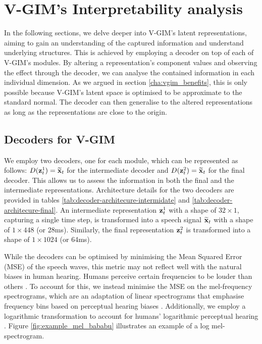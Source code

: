 \section{V-GIM's Interpretability analysis} 
	In the following sections, we delve deeper into V-GIM's latent representations, aiming to gain an understanding of the captured information and understand underlying structures. This is achieved by employing a decoder on top of each of V-GIM's modules. By altering a representation's component values and observing the effect through the decoder, we can analyse the contained information in each individual dimension. As we argued in section \ref{cha:vgim_benefits}, this is only possible because V-GIM's latent space is optimised to be approximate to the standard normal. The decoder can then generalise to the altered representations as long as the representations are close to the origin.
	
	\subsection{Decoders for V-GIM} \label{cha:experiments_interp_analy_decoder}
		We employ two decoders, one for each module, which can be represented as follows: $D(\mathbf{z}_t^1) = \widetilde{\mathbf{x}}_t$ for the intermediate decoder and $D(\mathbf{z}_t^2) = \widetilde{\mathbf{x}}_t$ for the final decoder. This allows us to assess the information in both the final and the intermediate representations. Architecture details for the two decoders are provided in tables \ref{tab:decoder-architecure-intermidate} and \ref{tab:decoder-architecure-final}. 
		An intermediate representation $\mathbf{z}_t^1$ with a shape of $32 \times 1$, capturing a single time step, is transformed into a speech signal $\widetilde{\mathbf{x}}_t$ with a shape of $1 \times 448$ (or 28ms). Similarly,  the final representation $\mathbf{z}_t^2$ is transformed into a shape of $1 \times 1024$ (or 64ms).
			
		
			
		While the decoders can be optimised by minimising the Mean Squared Error (MSE) of the speech waves, this metric may not reflect well with the natural biases in human hearing. Humans perceive certain frequencies to be louder than others \citep{radkoffLossFunctionsAudio2021, liSupervisedSpeechEnhancement2020}. To account for this, we instead minimise the MSE on the mel-frequency spectrograms, which are an adaptation of linear spectrograms that emphasise frequency bins based on perceptual hearing biases \citep{shenNaturalTTSSynthesis2018}. Additionally, we employ a logarithmic transformation to account for humans' logarithmic perceptual hearing \citep{braunConsolidatedViewLoss2020}. Figure \ref{fig:example_mel_bababu} illustrates an example of a log mel-spectrogram. 
		
